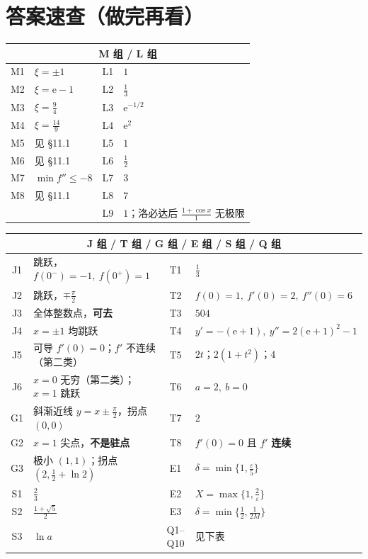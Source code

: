 \documentclass[11pt,a4paper]{ctexart}
\newcommand{\eps}{\varepsilon}
\newcommand{\ee}{\mathrm{e}}
\begin{document}
\section{答案速查（做完再看）}

\begin{center}
\small\setlength{\tabcolsep}{3pt}
\begin{tabularx}{\linewidth}{c|X|c|X}
\toprule
\multicolumn{4}{c}{\textbf{M 组 / L 组}} \\
\midrule
M1 & $\xi=\pm1$ & L1 & $1$ \\
M2 & $\xi=\ee-1$ & L2 & $\frac13$ \\
M3 & $\xi=\frac94$ & L3 & $\ee^{-1/2}$ \\
M4 & $\xi=\frac{14}{9}$ & L4 & $\ee^2$ \\
M5 & 见 \S 11.1 & L5 & $1$ \\
M6 & 见 \S 11.1 & L6 & $\frac12$ \\
M7 & $\min f''\leq-8$ & L7 & $3$ \\
M8 & 见 \S 11.1 & L8 & $7$ \\
   &             & L9 & $1$；洛必达后 $\frac{1+\cos x}{1}$ 无极限 \\
\bottomrule
\end{tabularx}
\end{center}

\begin{center}
\small\setlength{\tabcolsep}{3pt}
\begin{tabularx}{\linewidth}{c|X|c|X}
\toprule
\multicolumn{4}{c}{\textbf{J 组 / T 组 / G 组 / E 组 / S 组 / Q 组}} \\
\midrule
J1 & 跳跃，$f(0^-)=-1,\ f(0^+)=1$ & T1 & $\frac13$ \\
J2 & 跳跃，$\mp\frac\pi2$ & T2 & $f(0)=1,\ f'(0)=2,\ f''(0)=6$ \\
J3 & 全体整数点，\textbf{可去} & T3 & $504$ \\
J4 & $x=\pm1$ 均跳跃 & T4 & $y'=-(\ee+1),\ y''=2(\ee+1)^2-1$ \\
J5 & 可导 $f'(0)=0$；$f'$ 不连续（第二类） & T5 & $2t$；$2(1+t^2)$；$4$ \\
J6 & $x=0$ 无穷（第二类）；$x=1$ 跳跃 & T6 & $a=2,\ b=0$ \\
G1 & 斜渐近线 $y=x\pm\frac\pi2$，拐点 $(0,0)$ & T7 & $2$ \\
G2 & $x=1$ 尖点，\textbf{不是驻点} & T8 & $f'(0)=0$ 且 $f'$ \textbf{连续} \\
G3 & 极小 $(1,1)$；拐点 $(2,\frac12+\ln2)$ & E1 & $\delta=\min\{1,\frac\eps5\}$ \\
S1 & $\frac23$ & E2 & $X=\max\{1,\frac2\eps\}$ \\
S2 & $\frac{1+\sqrt5}{2}$ & E3 & $\delta=\min\{\frac12,\frac1{2M}\}$ \\
S3 & $\ln a$ & Q1--Q10 & 见下表 \\
\bottomrule
\end{tabularx}
\end{center}
\end{document}
